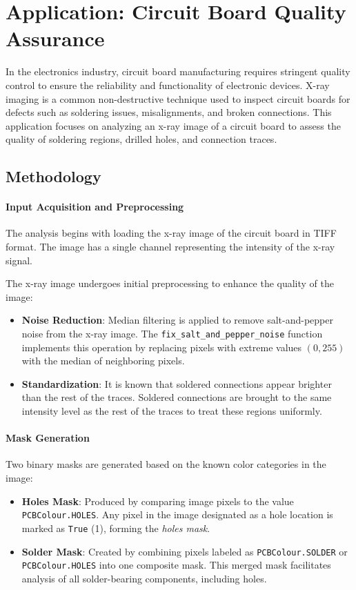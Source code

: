 \documentclass[a4paper,12pt]{article}
\begin{document}
\newpage

\section{Application: Circuit Board Quality Assurance}

In the electronics industry, circuit board manufacturing requires stringent quality control to ensure the reliability and functionality of electronic devices. X-ray imaging is a common non-destructive technique used to inspect circuit boards for defects such as soldering issues, misalignments, and broken connections. This application focuses on analyzing an x-ray image of a circuit board to assess the quality of soldering regions, drilled holes, and connection traces.

\subsection{Methodology}

\paragraph{Input Acquisition and Preprocessing}

The analysis begins with loading the x-ray image of the circuit board in TIFF format. The image has a single channel representing the intensity of the x-ray signal.

The x-ray image undergoes initial preprocessing to enhance the quality of the image:
\begin{itemize}
    \item \textbf{Noise Reduction}: Median filtering is applied to remove salt-and-pepper noise from the x-ray image. The \texttt{fix\_salt\_and\_pepper\_noise} function implements this operation by replacing pixels with extreme values \((0, 255)\) with the median of neighboring pixels.
    \item \textbf{Standardization}: It is known that soldered connections appear brighter than the rest of the traces. Soldered connections are brought to the same intensity level as the rest of the traces to treat these regions uniformly.
\end{itemize}

\paragraph{Mask Generation}

Two binary masks are generated based on the known color categories in the image:
\begin{itemize}
    \item \textbf{Holes Mask}: Produced by comparing image pixels to the value \texttt{PCBColour.HOLES}. Any pixel in the image designated as a hole location is marked as \texttt{True} (1), forming the \emph{holes mask}.
    \item \textbf{Solder Mask}: Created by combining pixels labeled as \texttt{PCBColour.SOLDER} or \texttt{PCBColour.HOLES} into one composite mask. This merged mask facilitates analysis of all solder-bearing components, including holes.
\end{itemize}
\end{document}
